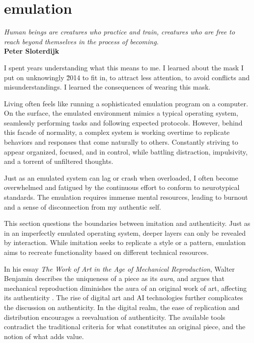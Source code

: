 \chapter*{emulation}
\begin{center}
\vspace{2cm}
\begin{flushright}
\large
\textit{Human beings are creatures who practice and train, creatures who are free to reach beyond themselves in the process of becoming.}\\
\textbf{Peter Sloterdijk} \citep{sloterdijk2014}
\end{flushright}
\vspace{2cm}
\end{center}
\normalsize

I spent years understanding what this means to me. I learned about the mask I put on unknowingly \u2014 to fit in, to attract less attention, to avoid conflicts and misunderstandings. I learned the consequences of wearing this mask.

Living often feels like running a sophisticated emulation program on a computer. On the surface, the emulated environment mimics a typical operating system, seamlessly performing tasks and following expected protocols. However, behind this facade of normality, a complex system is working overtime to replicate behaviors and responses that come naturally to others. Constantly striving to appear organized, focused, and in control, while battling distraction, impulsivity, and a torrent of unfiltered thoughts.

Just as an emulated system can lag or crash when overloaded, I often become overwhelmed and fatigued by the continuous effort to conform to neurotypical standards. The emulation requires immense mental resources, leading to burnout and a sense of disconnection from my authentic self.

This section questions the boundaries between imitation and authenticity. Just as in an imperfectly emulated operating system, deeper layers can only be revealed by interaction. While imitation seeks to replicate a style or a pattern, emulation aims to recreate functionality based on different technical resources.

In his essay \textit{The Work of Art in the Age of Mechanical Reproduction}, Walter Benjamin describes the uniqueness of a piece as its \textit{aura}, and argues that mechanical reproduction diminishes the aura of an original work of art, affecting its authenticity \citep{benjamin1935}. The rise of digital art and AI technologies further complicates the discussion on authenticity. In the digital realm, the ease of replication and distribution encourages a reevaluation of authenticity. The available tools contradict the traditional criteria for what constitutes an original piece, and the notion of what adds value.

